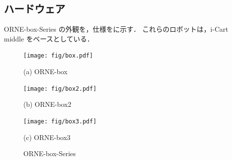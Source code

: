 \documentclass[twocolumn, 9pt]{jsproceedings}
\begin{document}
\subsection{ハードウェア}
ORNE-box-Series の外観を，仕様をに示す．
これらのロボットは，i-Cart middle\cite{icart} をベースとしている．

\begin{figure}[h]
  \centering
  \begin{minipage}[b]{0.3\linewidth}
    \centering
    \texttt{[image: fig/box.pdf]}
    \caption*{(a) ORNE-box}
  \end{minipage} 
  \hspace{-1.2mm}
  \begin{minipage}[b]{0.3\linewidth}
    \centering
    \texttt{[image: fig/box2.pdf]}
    \caption*{(b) ORNE-box2}
  \end{minipage}
  \begin{minipage}[b]{0.3\linewidth}
    \centering
    \texttt{[image: fig/box3.pdf]}
    \caption*{(c) ORNE-box3}
  \end{minipage}
  \caption{ORNE-box-Series}
  \label{fig:orne-series}
\end{figure}

\vspace*{-8mm}
\end{document}
